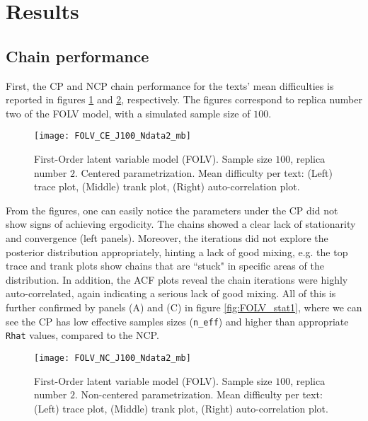 \section{Results}

\subsection{Chain performance}

First, the CP and NCP chain performance for the texts' mean difficulties is reported in figures \ref{fig:FOLV_CE_chains1} and \ref{fig:FOLV_NC_chains1}, respectively. The figures correspond to replica number two of the FOLV model, with a simulated sample size of $100$. 
%
\begin{figure}[H]
	\centering
	\texttt{[image: FOLV\_CE\_J100\_Ndata2\_mb]}
	\caption[First-Order latent variable model (FOLV). Sample size $100$, replica number $2$. Centered parametrization. Mean difficulty per text. Trace, trank and auto-correlation plots.]%
	{First-Order latent variable model (FOLV). Sample size $100$, replica number $2$. Centered parametrization. Mean difficulty per text: (Left) trace plot, (Middle) trank plot, (Right) auto-correlation plot.}
	\label{fig:FOLV_CE_chains1}
\end{figure}

From the figures, one can easily notice the parameters under the CP did not show signs of achieving ergodicity. The chains showed a clear lack of stationarity and convergence (left panels). Moreover, the iterations did not explore the posterior distribution appropriately, hinting a lack of good mixing, e.g. the top trace and trank plots show chains that are ``stuck" in specific areas of the distribution. In addition, the ACF plots reveal the chain iterations were highly auto-correlated, again indicating a serious lack of good mixing. All of this is further confirmed by panels (A) and (C) in figure \ref{fig:FOLV_stat1}, where we can see the CP has low effective samples sizes (\texttt{n\_eff}) and higher than appropriate \texttt{Rhat} values, compared to the NCP.
%
\begin{figure}[H]
	\centering
	\texttt{[image: FOLV\_NC\_J100\_Ndata2\_mb]}
	\caption[First-Order latent variable model (FOLV). Sample size $100$, replica number $2$. Non-centered parametrization. Mean difficulty per text. Trace, trank and auto-correlation plots.]%
	{First-Order latent variable model (FOLV). Sample size $100$, replica number $2$. Non-centered parametrization. Mean difficulty per text: (Left) trace plot, (Middle) trank plot, (Right) auto-correlation plot.}
	\label{fig:FOLV_NC_chains1}
\end{figure}

